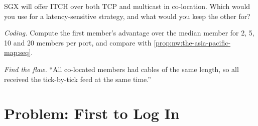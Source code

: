 \begin{exercise}[$\star\star$]\label{exo:nw:the-asia-pacific-map:6}
SGX will offer ITCH over both TCP and multicast in co-location. Which would you use for a latency-sensitive strategy, and what would you keep the
other for?
\end{exercise}

\begin{exercise}[$\star\star\star$]\label{exo:nw:the-asia-pacific-map:7}
\emph{Coding.} Compute the first member's advantage over the median member for 2, 5, 10 and 20 members per port, and compare with
\cref{prop:nw:the-asia-pacific-map:seq}.
\end{exercise}

\begin{exercise}[$\star\star\star$]\label{exo:nw:the-asia-pacific-map:8}
\emph{Find the flaw.} ``All co-located members had cables of the same length, so all received the tick-by-tick feed at the same time.''
\end{exercise}

\section{Problem: First to Log In}

